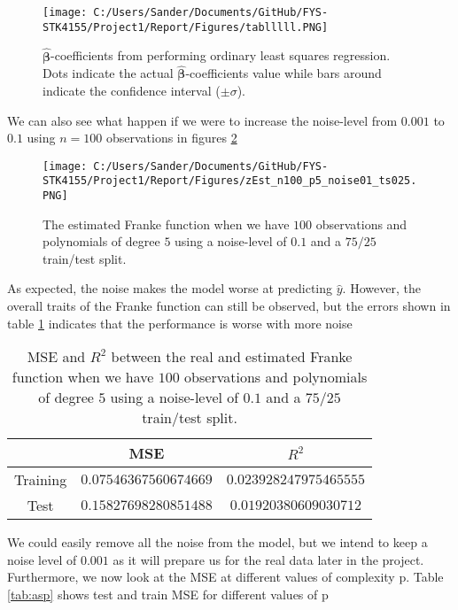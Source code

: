 \documentclass[12pt,a4paper]{article}
\begin{document}
\begin{figure}[H]
\centering
\texttt{[image: C:/Users/Sander/Documents/GitHub/FYS-STK4155/Project1/Report/Figures/tablllll.PNG]}
\caption{\label{fig:betaIntALL2} $\hat{\boldsymbol{\beta}}$-coefficients from performing ordinary least squares regression. Dots indicate the actual $\hat{\boldsymbol{\beta}}$-coefficients value while bars around indicate the confidence interval ($\pm \sigma$).}
\end{figure}

\noindent We can also see what happen if we were to increase the noise-level from $0.001$ to $0.1$ using $n = 100$ observations in figures \ref{fig:FrankeEst3}

\begin{figure}[h]
\centering
\texttt{[image: C:/Users/Sander/Documents/GitHub/FYS-STK4155/Project1/Report/Figures/zEst\_n100\_p5\_noise01\_ts025.PNG]}
\caption{\label{fig:FrankeEst3} The estimated Franke function when we have $100$ observations and polynomials of degree $5$ using a noise-level of $0.1$ and a $75/25$ train/test split.}
\end{figure}

\noindent As expected, the noise makes the model worse at predicting $\hat{y}$. However, the overall traits of the Franke function can still be observed, but the errors shown in table \ref{tab:ESTREAL3} indicates that the performance is worse with more noise

\begin{table}[H]
\caption{\label{tab:ESTREAL3} MSE and $R^2$ between the real and estimated Franke function when we have $100$ observations and polynomials of degree $5$ using a noise-level of $0.1$ and a $75/25$ train/test split.}
\centering
\begin{tabular}{c|c|c}
 & MSE & $R^2$\\
\hline
Training & $0.07546367560674669$ & $0.023928247975465555$\\
\hline
Test & $0.15827698280851488$ & $0.01920380609030712$\\	  
\end{tabular}
\end{table}

\noindent We could easily remove all the noise from the model, but we intend to keep a noise level of $0.001$ as it will prepare us for the real data later in the project. Furthermore, we now look at the MSE at different values of complexity p. Table \ref{tab:asp} shows test and train MSE for different values of p
\end{document}

